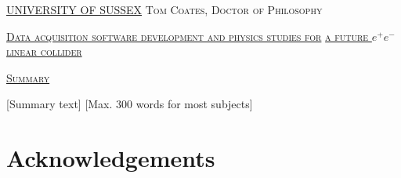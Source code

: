 \documentclass[a4paper,11pt]{report}
\newcommand{\linespacing}{1.5}
\renewcommand{\baselinestretch}{\linespacing}
\begin{document}
\thispagestyle{empty}
\newpage
\null\vskip10mm
\begin{center}
\large
\underline{UNIVERSITY OF SUSSEX}
\vskip20mm
\textsc{Tom Coates, Doctor of Philosophy}
\vskip20mm
\begin{center}
	\scshape
	\underline{Data acquisition software development and physics studies for}
	\underline{a future $e^+e^-$ linear collider}
\end{center}
\vskip0mm
\vskip20mm
\underline{\textsc{Summary}}
\vskip2mm
\end{center}
\renewcommand{\baselinestretch}{1.0}
\small\normalsize
[Summary text] [Max. 300 words for most subjects]


\chapter*{Acknowledgements}
%

\renewcommand{\baselinestretch}{\linespacing}
\small\normalsize


\newpage
{}
\tableofcontents

\newpage
{}









\end{document}
